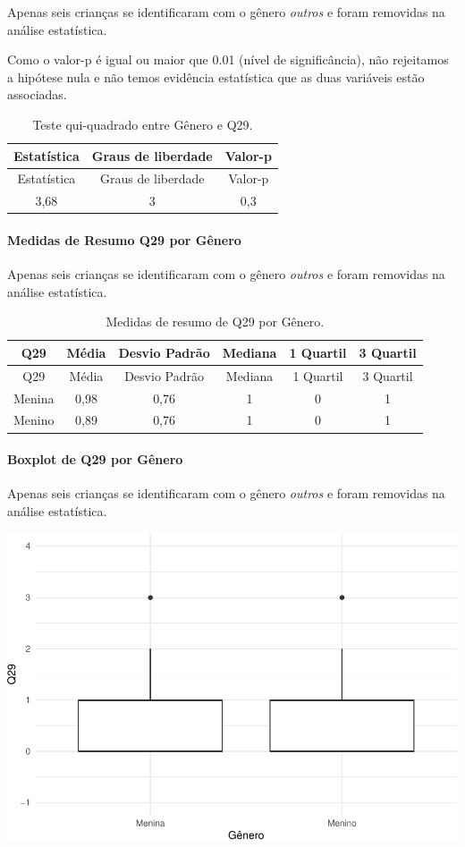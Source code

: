 \documentclass[]{article}
\let\oldparagraph\paragraph
\renewcommand{\paragraph}[1]{\oldparagraph{#1}\mbox{}}
\begin{document}
Apenas seis crianças se identificaram com o gênero \emph{outros} e foram removidas na análise estatística.

Como o valor-p é igual ou maior que 0.01 (nível de significância), não rejeitamos a hipótese nula e não temos evidência estatística que as duas variáveis estão associadas.

\begin{longtable}[]{@{}ccc@{}}
\caption{\label{tab:unnamed-chunk-911}Teste qui-quadrado entre Gênero e Q29.}\tabularnewline
\toprule
Estatística & Graus de liberdade & Valor-p\tabularnewline
\midrule
\endfirsthead
\toprule
Estatística & Graus de liberdade & Valor-p\tabularnewline
\midrule
\endhead
3,68 & 3 & 0,3\tabularnewline
\bottomrule
\end{longtable}

\cleardoublepage

\hypertarget{medidas-de-resumo-q29-por-guxeanero}{%
\paragraph{Medidas de Resumo Q29 por Gênero}\label{medidas-de-resumo-q29-por-guxeanero}}

Apenas seis crianças se identificaram com o gênero \emph{outros} e foram removidas na análise estatística.

\begin{longtable}[]{@{}cccccc@{}}
\caption{\label{tab:unnamed-chunk-912}Medidas de resumo de Q29 por Gênero.}\tabularnewline
\toprule
Q29 & Média & Desvio Padrão & Mediana & 1 Quartil & 3 Quartil\tabularnewline
\midrule
\endfirsthead
\toprule
Q29 & Média & Desvio Padrão & Mediana & 1 Quartil & 3 Quartil\tabularnewline
\midrule
\endhead
Menina & 0,98 & 0,76 & 1 & 0 & 1\tabularnewline
Menino & 0,89 & 0,76 & 1 & 0 & 1\tabularnewline
\bottomrule
\end{longtable}

\hypertarget{boxplot-de-q29-por-guxeanero}{%
\paragraph{Boxplot de Q29 por Gênero}\label{boxplot-de-q29-por-guxeanero}}

Apenas seis crianças se identificaram com o gênero \emph{outros} e foram removidas na análise estatística.

\begin{center}\includegraphics[width=0.75\linewidth]{relatorio_covid19_files/figure-latex/unnamed-chunk-913-1} \end{center}
\end{document}
